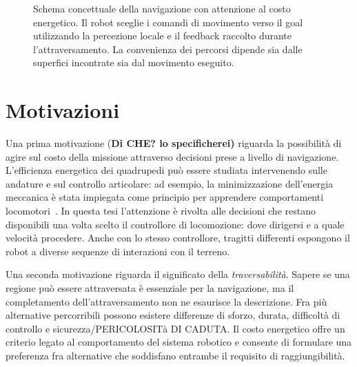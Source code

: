 \begin{figure}[tbp]
    \centering
    \caption{Schema concettuale della navigazione con attenzione al costo energetico. Il robot sceglie i comandi di movimento verso il goal utilizzando la percezione locale e il feedback raccolto durante l'attraversamento. La convenienza dei percorsi dipende sia dalle superfici incontrate sia dal movimento eseguito.}
    \label{fig:intro-scelta-percorso}
\end{figure}

\section{Motivazioni}
\label{sec:intro-motivazioni}

Una prima motivazione (\textbf{Di CHE? lo specificherei)} riguarda la possibilità di agire sul costo della missione attraverso decisioni prese a livello di navigazione. L'efficienza energetica dei quadrupedi può essere studiata intervenendo sulle andature e sul controllo articolare: ad esempio, la minimizzazione dell'energia meccanica è stata impiegata come principio per apprendere comportamenti locomotori~\citep{Fu2022Gaits}. In questa tesi l'attenzione è rivolta alle decisioni che restano disponibili una volta scelto il controllore di locomozione: dove dirigersi e a quale velocità procedere. Anche con lo stesso controllore, tragitti differenti espongono il robot a diverse sequenze di interazioni con il terreno.

Una seconda motivazione riguarda il significato della \emph{traversabilità}. Sapere se una regione può essere attraversata è essenziale per la navigazione, ma il completamento dell'attraversamento non ne esaurisce la descrizione. Fra più alternative percorribili possono esistere differenze di sforzo, durata, difficoltà di controllo e sicurezza/PERICOLOSITà DI CADUTA. Il costo energetico offre un criterio legato al comportamento del sistema robotico e consente di formulare una preferenza fra alternative che soddisfano entrambe il requisito di raggiungibilità.

